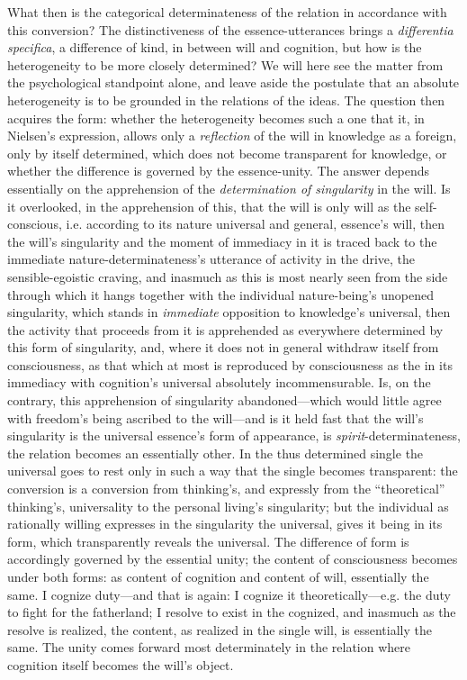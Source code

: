 \documentclass[12pt,a4paper]{book}
\begin{document}
What then is the categorical determinateness of the relation in accordance with this conversion?
The distinctiveness of the essence-utterances brings a \textit{differentia specifica}, a difference
of kind, in between will and cognition, but how is the heterogeneity to be more closely determined?
We will here see the matter from the psychological standpoint alone, and leave aside the postulate
that an absolute heterogeneity is to be grounded in the relations of the ideas. The question then
acquires the form: whether the heterogeneity becomes such a one that it, in Nielsen's expression,
allows only a \emph{reflection} of the will in knowledge as a foreign, only by itself determined, which
does not become transparent for knowledge, or whether the difference is governed by the
essence-unity. The answer depends essentially on the apprehension of the \emph{determination of
singularity} in the will. Is it overlooked, in the apprehension of this, that the will is only will
as the self-conscious, i.e. according to its nature universal and general, essence's will, then the
will's singularity and the moment of immediacy in it is traced back to the immediate
nature-determinateness's utterance of activity in the drive, the sensible-egoistic craving, and
inasmuch as this is most nearly seen from the side through which it hangs together with the
individual nature-being's unopened singularity, which stands in \emph{immediate} opposition to
knowledge's universal, then the activity that proceeds from it is apprehended as everywhere
determined by this form of singularity, and, where it does not in general withdraw itself from
consciousness, as that which at most is reproduced by consciousness as the in its immediacy with
cognition's universal absolutely incommensurable. Is, on the contrary, this apprehension of
singularity abandoned---which would little agree with freedom's being ascribed to the will---and is
it held fast that the will's singularity is the universal essence's form of appearance, is
\emph{spirit}-determinateness, the relation becomes an essentially other. In the thus determined
single the universal goes to rest only in such a way that the single becomes transparent: the
conversion is a conversion from thinking's, and expressly from the ``theoretical'' thinking's,
universality to the personal living's singularity; but the individual as rationally willing
expresses in the singularity the universal, gives it being in its form, which transparently reveals
the universal. The difference of form is accordingly governed by the essential unity; the content of
consciousness becomes under both forms: as content of cognition and content of will, essentially the
same. I cognize duty---and that is again: I cognize it theoretically---e.g. the duty to fight for
the fatherland; I resolve to exist in the cognized, and inasmuch as the resolve is realized, the
content, as realized in the single will, is essentially the same. The unity comes forward most
determinately in the relation where cognition itself becomes the will's object.
\end{document}
